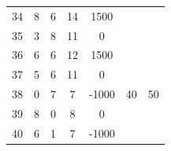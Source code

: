 \documentclass[12pt]{jarticle}
\begin{document}
\begin{table}
\begin{tabular}[h]{|r|c|c|c|c|c|c|}
        34       & 8             & 6             & 14           & 1500  &          &              \\
        35       & 3             & 8             & 11           & 0     &          &              \\
        \hline36 & 6             & 6             & 12           & 1500  &          &              \\
        37       & 5             & 6             & 11           & 0     &          &              \\
        38       & 0             & 7             & 7            & -1000 & 40       & 50           \\
        39       & 8             & 0             & 8            & 0     &          &              \\
        40       & 6             & 1             & 7            & -1000 &          &              \\
        \hline
    \end{tabular}
\end{table}
\clearpage
\end{document}
